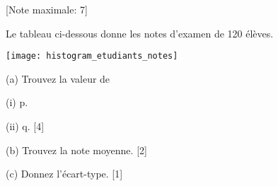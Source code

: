 \begin{question}
  \hspace*{\fill} [Note maximale: 7]\par
  \medskip
  \noindent Le tableau ci-dessous donne les notes d’examen de 120 élèves.\par
  \medskip
  \texttt{[image: histogram\_etudiants\_notes]}\par
  (a) Trouvez la valeur de\par
  \medskip
  \hspace{2em}(i)  p.\par
  \medskip
  \hspace{2em}(ii) q.\hspace*{\fill} [4]\par
  \medskip
  (b) Trouvez la note moyenne.\hspace*{\fill} [2]\par
  \medskip
  (c) Donnez l'écart-type.\hspace*{\fill} [1]\par
\end{question}

